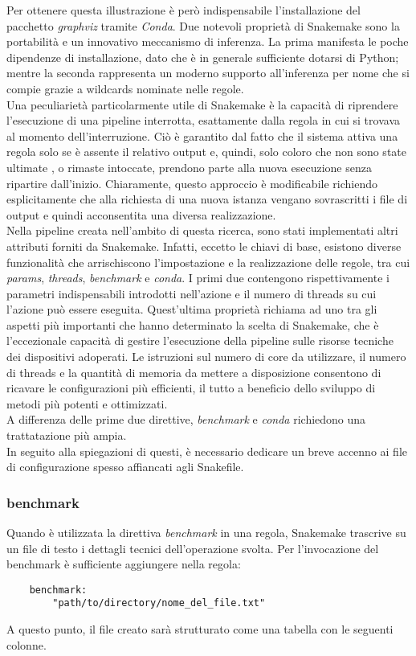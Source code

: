 Per ottenere questa illustrazione è però indispensabile l'installazione del pacchetto \textit{graphviz} tramite \textit{Conda}. 
Due notevoli proprietà di Snakemake sono la portabilità e un innovativo meccanismo di inferenza. La prima manifesta le poche dipendenze di installazione, dato che è in generale sufficiente dotarsi di Python; mentre la seconda rappresenta un moderno supporto all'inferenza per nome che si compie grazie a wildcards nominate nelle regole.\\
Una peculiarietà particolarmente utile di Snakemake è la capacità di riprendere l'esecuzione di una pipeline interrotta, esattamente dalla regola in cui si trovava al momento dell'interruzione. Ciò è garantito dal fatto che il sistema attiva una regola solo se è assente il relativo output e, quindi, solo coloro che non sono state ultimate , o rimaste intoccate, prendono parte alla nuova esecuzione senza ripartire dall'inizio. Chiaramente, questo approccio è modificabile richiendo esplicitamente che alla richiesta di una nuova istanza vengano sovrascritti i file di output e quindi acconsentita una diversa realizzazione. \\ 
Nella pipeline creata nell'ambito di questa ricerca, sono stati implementati altri attributi forniti da Snakemake. Infatti, eccetto le chiavi di base, esistono diverse funzionalità che arrischiscono l'impostazione e la realizzazione delle regole, tra cui \textit{params}, \textit{threads}, \textit{benchmark} e \textit{conda}. I primi due contengono rispettivamente i parametri indispensabili introdotti nell'azione e il numero di threads su cui l'azione può essere eseguita. Quest'ultima proprietà richiama ad uno tra gli aspetti più importanti che hanno determinato la scelta di Snakemake, che è  l'eccezionale capacità di gestire l'esecuzione della pipeline sulle risorse tecniche dei dispositivi adoperati. Le istruzioni sul numero di core da utilizzare, il numero di threads e la quantità di memoria da mettere a disposizione consentono di ricavare le configurazioni più efficienti, il tutto a beneficio dello sviluppo di metodi più potenti e ottimizzati. \\
A differenza delle prime due direttive, \textit{benchmark} e \textit{conda} richiedono una trattatazione più ampia. \\
In seguito alla spiegazioni di questi, è necessario dedicare un breve accenno ai file di configurazione spesso affiancati agli Snakefile.  

\subsubsection{benchmark}
Quando è utilizzata la direttiva \textit{benchmark} in una regola, Snakemake trascrive su un file di testo i dettagli tecnici dell'operazione svolta. Per l'invocazione del benchmark è sufficiente aggiungere nella regola:
\begin{lstlisting}
	benchmark:
		"path/to/directory/nome_del_file.txt"
\end{lstlisting}
A questo punto, il file creato sarà strutturato come una tabella con le seguenti colonne.

